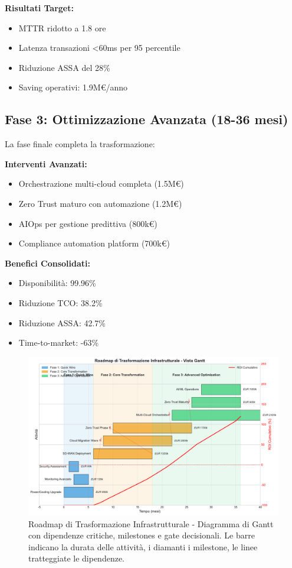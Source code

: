 \textbf{Risultati Target:}
\begin{itemize}
    \item MTTR ridotto a 1.8 ore
    \item Latenza transazioni <60ms per 95 percentile
    \item Riduzione ASSA del 28\%
    \item Saving operativi: 1.9M€/anno
\end{itemize}

\subsection{Fase 3: Ottimizzazione Avanzata (18-36 mesi)}

La fase finale completa la trasformazione:

\textbf{Interventi Avanzati:}
\begin{itemize}
    \item Orchestrazione multi-cloud completa (1.5M€)
    \item Zero Trust maturo con automazione (1.2M€)
    \item AIOps per gestione predittiva (800k€)
    \item Compliance automation platform (700k€)
\end{itemize}

\textbf{Benefici Consolidati:}
\begin{itemize}
    \item Disponibilità: 99.96\%
    \item Riduzione TCO: 38.2\%
    \item Riduzione ASSA: 42.7\%
    \item Time-to-market: -63\%
\end{itemize}

\begin{figure}[htbp]
\centering
\includegraphics[width=1\textwidth]{thesis_figures/cap3/figura_3_4_roadmap.pdf}
\caption{Roadmap di Trasformazione Infrastrutturale - Diagramma di Gantt con dipendenze critiche, milestones e gate decisionali. Le barre indicano la durata delle attività, i diamanti i milestone, le linee tratteggiate le dipendenze.}
\label{fig:roadmap_transformation}
\end{figure}

